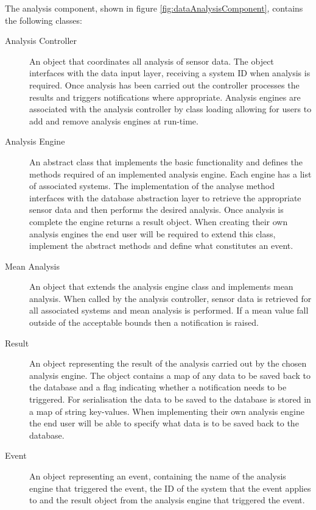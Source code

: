 \documentclass[10pt,a4paper]{article}
\begin{document}
The analysis component, shown in figure
\ref{fig:dataAnalysisComponent}, contains the following classes:

\begin{description}
  \item [Analysis Controller] An object that coordinates all analysis of
    sensor data. The object interfaces with the data input layer,
    receiving a system ID when analysis is required. Once analysis has
    been carried out the controller processes the results and triggers
    notifications where appropriate. Analysis engines are associated
    with the analysis controller by class loading allowing for users to
    add and remove analysis engines at run-time.

  \item [Analysis Engine] An abstract class that implements the basic
    functionality and defines the methods required of an implemented
    analysis engine. Each engine has a list of associated systems. The
    implementation of the analyse method interfaces with the database
    abstraction layer to retrieve the appropriate sensor data and then
    performs the desired analysis. Once analysis is complete the engine 
    returns a result object. When creating their own analysis 
    engines the end user will be required to extend this class, implement 
    the abstract methods and define what constitutes an event.

  \item [Mean Analysis] An object that extends the analysis engine
    class and implements mean analysis. When called by the analysis
    controller, sensor data is retrieved for all associated systems
    and mean analysis is performed. If a mean value fall outside of
    the acceptable bounds then a notification is raised.

  \item [Result] An object representing the result of the analysis
    carried out by the chosen analysis engine. The object contains a
    map of any data to be saved back to the database and a flag
    indicating whether a notification needs to be triggered. For
    serialisation the data to be saved to the database is stored in a
    map of string key-values. When implementing their own analysis
    engine the end user will be able to specify what data is to be
    saved back to the database.

  \item [Event] An object representing an event,
    containing the name of the analysis engine that triggered the
    event, the ID of the system that the event applies
    to and the result object from the analysis engine that triggered
    the event.
\end{description}
\end{document}
